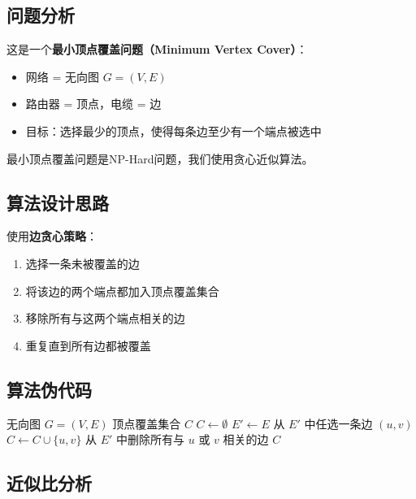 \documentclass[UTF8,12pt,a4paper]{ctexart}
\begin{document}
\subsection*{问题分析}

这是一个\textbf{最小顶点覆盖问题（Minimum Vertex Cover）}：
\begin{itemize}
	\item 网络 = 无向图 $G = (V, E)$
	\item 路由器 = 顶点，电缆 = 边
	\item 目标：选择最少的顶点，使得每条边至少有一个端点被选中
\end{itemize}

最小顶点覆盖问题是NP-Hard问题，我们使用贪心近似算法。

\subsection*{算法设计思路}

使用\textbf{边贪心策略}：
\begin{enumerate}
	\item 选择一条未被覆盖的边
	\item 将该边的两个端点都加入顶点覆盖集合
	\item 移除所有与这两个端点相关的边
	\item 重复直到所有边都被覆盖
\end{enumerate}

\subsection*{算法伪代码}

\begin{algorithm}[H]
	\caption{顶点覆盖近似算法}
	\begin{algorithmic}[1]
		\Require 无向图 $G = (V, E)$
		\Ensure 顶点覆盖集合 $C$
		\State $C \gets \emptyset$ 
		\State $E' \gets E$ 
			\State 从 $E'$ 中任选一条边 $(u, v)$
			\State $C \gets C \cup \{u, v\}$ 
			\State 从 $E'$ 中删除所有与 $u$ 或 $v$ 相关的边
		\EndWhile
		\State \Return $C$
	\end{algorithmic}
\end{algorithm}

\subsection*{近似比分析}
\end{document}
